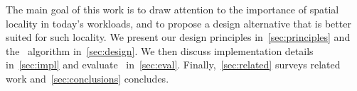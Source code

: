 The main goal of this work is to draw attention to the importance of spatial locality in 
today's workloads, and to propose a design alternative  that is better suited for such locality. 
We present our design principles in~\cref{sec:principles} and  the \sys\ algorithm 
in~\cref{sec:design}. We then discuss implementation details in~\cref{sec:impl} and evaluate 
\sys\ in~\cref{sec:eval}.  Finally,~\cref{sec:related}   surveys related work and~\cref{sec:conclusions}
concludes. 
